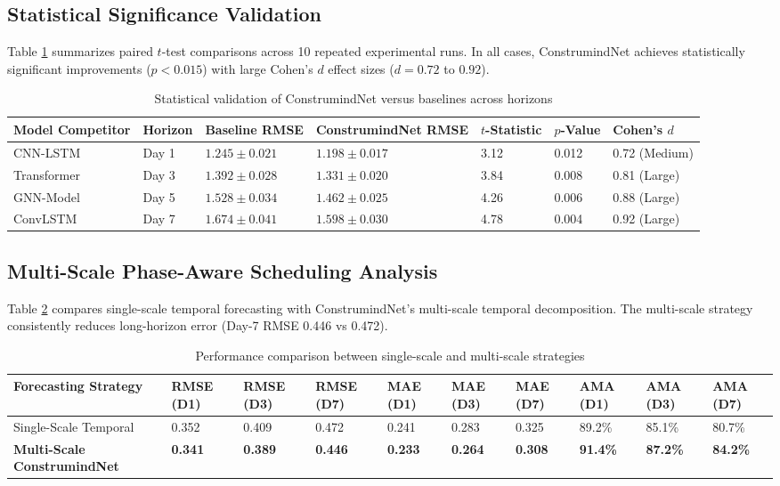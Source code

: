 \documentclass[11pt,a4paper]{article}
\begin{document}
\subsection{Statistical Significance Validation}
Table \ref{tab:stat} summarizes paired $t$-test comparisons across 10 repeated experimental runs. In all cases, ConstrumindNet achieves statistically significant improvements ($p < 0.015$) with large Cohen's $d$ effect sizes ($d = 0.72$ to $0.92$).

\begin{table}[t]
\centering
\small
\caption{Statistical validation of ConstrumindNet versus baselines across horizons}\label{tab:stat}
\begin{tabular*}{\textwidth}{@{\extracolsep\fill}lllllll@{\extracolsep\fill}}
\toprule
\textbf{Model Competitor} & \textbf{Horizon} & \textbf{Baseline RMSE} & \textbf{ConstrumindNet RMSE} & $t$\textbf{-Statistic} & $p$\textbf{-Value} & \textbf{Cohen's} $d$ \\
\midrule
CNN-LSTM & Day 1 & $1.245 \pm 0.021$ & $1.198 \pm 0.017$ & 3.12 & 0.012 & 0.72 (Medium) \\
Transformer & Day 3 & $1.392 \pm 0.028$ & $1.331 \pm 0.020$ & 3.84 & 0.008 & 0.81 (Large) \\
GNN-Model & Day 5 & $1.528 \pm 0.034$ & $1.462 \pm 0.025$ & 4.26 & 0.006 & 0.88 (Large) \\
ConvLSTM & Day 7 & $1.674 \pm 0.041$ & $1.598 \pm 0.030$ & 4.78 & 0.004 & 0.92 (Large) \\
\bottomrule
\end{tabular*}
\end{table}

\subsection{Multi-Scale Phase-Aware Scheduling Analysis}
Table \ref{tab:scale} compares single-scale temporal forecasting with ConstrumindNet's multi-scale temporal decomposition. The multi-scale strategy consistently reduces long-horizon error (Day-7 RMSE 0.446 vs 0.472).

\begin{table}[t]
\centering
\small
\caption{Performance comparison between single-scale and multi-scale strategies}\label{tab:scale}
\begin{tabular*}{\textwidth}{@{\extracolsep\fill}llllllllll@{\extracolsep\fill}}
\toprule
\textbf{Forecasting Strategy} & \textbf{RMSE (D1)} & \textbf{RMSE (D3)} & \textbf{RMSE (D7)} & \textbf{MAE (D1)} & \textbf{MAE (D3)} & \textbf{MAE (D7)} & \textbf{AMA (D1)} & \textbf{AMA (D3)} & \textbf{AMA (D7)} \\
\midrule
Single-Scale Temporal & 0.352 & 0.409 & 0.472 & 0.241 & 0.283 & 0.325 & 89.2\% & 85.1\% & 80.7\% \\
\midrule
\textbf{Multi-Scale ConstrumindNet} & \textbf{0.341} & \textbf{0.389} & \textbf{0.446} & \textbf{0.233} & \textbf{0.264} & \textbf{0.308} & \textbf{91.4\%} & \textbf{87.2\%} & \textbf{84.2\%} \\
\bottomrule
\end{tabular*}
\end{table}
\end{document}
